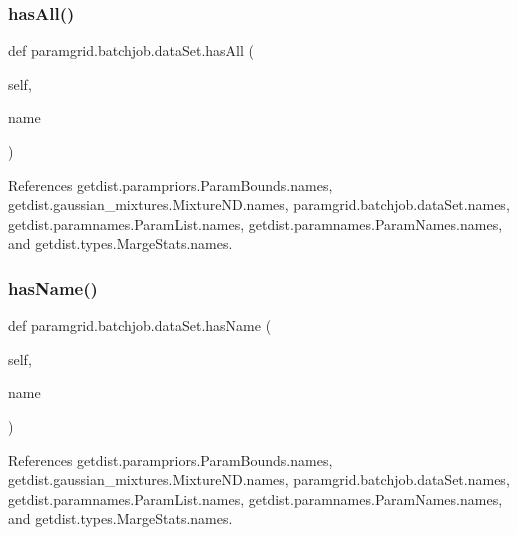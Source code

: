 \subsubsection{\texorpdfstring{has\+All()}{hasAll()}}
{\footnotesize\ttfamily def paramgrid.\+batchjob.\+data\+Set.\+has\+All (\begin{DoxyParamCaption}\item[{}]{self,  }\item[{}]{name }\end{DoxyParamCaption})}



References getdist.\+parampriors.\+Param\+Bounds.\+names, getdist.\+gaussian\+\_\+mixtures.\+Mixture\+N\+D.\+names, paramgrid.\+batchjob.\+data\+Set.\+names, getdist.\+paramnames.\+Param\+List.\+names, getdist.\+paramnames.\+Param\+Names.\+names, and getdist.\+types.\+Marge\+Stats.\+names.

\mbox{\label{classparamgrid_1_1batchjob_1_1dataSet_a8cc0a618846cc7e6540f8c238c5c6d22}} 
\subsubsection{\texorpdfstring{has\+Name()}{hasName()}}
{\footnotesize\ttfamily def paramgrid.\+batchjob.\+data\+Set.\+has\+Name (\begin{DoxyParamCaption}\item[{}]{self,  }\item[{}]{name }\end{DoxyParamCaption})}



References getdist.\+parampriors.\+Param\+Bounds.\+names, getdist.\+gaussian\+\_\+mixtures.\+Mixture\+N\+D.\+names, paramgrid.\+batchjob.\+data\+Set.\+names, getdist.\+paramnames.\+Param\+List.\+names, getdist.\+paramnames.\+Param\+Names.\+names, and getdist.\+types.\+Marge\+Stats.\+names.

\mbox{\label{classparamgrid_1_1batchjob_1_1dataSet_addd5471366fd629a38a1ec8f90d202a7}} 

